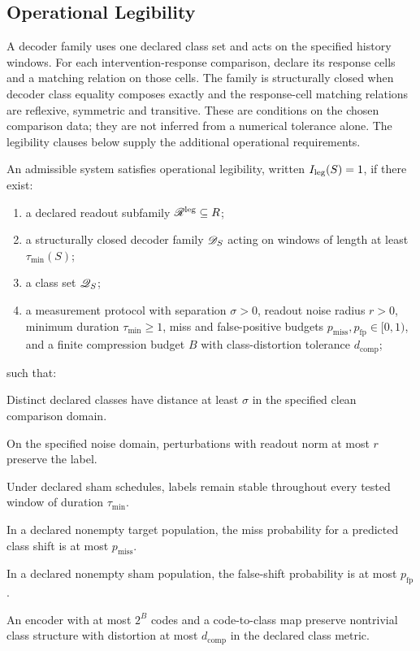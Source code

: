 \subsection{Operational Legibility}\label{sec:legibility}

\begin{definition}\label{def:decoder}
A decoder family uses one declared class set and acts on the specified history windows. For each intervention-response comparison, declare its response cells and a matching relation on those cells. The family is structurally closed when decoder class equality composes exactly and the response-cell matching relations are reflexive, symmetric and transitive. These are conditions on the chosen comparison data; they are not inferred from a numerical tolerance alone. The legibility clauses below supply the additional operational requirements.
\end{definition}

\begin{definition}\label{def:ileg}
An admissible system satisfies operational legibility, written $I_{\mathrm{leg}}(S)=1$, if there exist:
\begin{enumerate}[leftmargin=1.5em]
\item a declared readout subfamily $\mathscr{R}^{\mathrm{leg}}\subseteq R$;
\item a structurally closed decoder family $\mathscr{D}_S$ acting on windows of length at least $\tau_{\min}(S)$;
\item a class set $\mathscr{Q}_S$;
\item a measurement protocol with separation $\sigma>0$, readout noise radius $r>0$, minimum duration $\tau_{\min}\ge1$, miss and false-positive budgets $p_{\mathrm{miss}},p_{\mathrm{fp}}\in[0,1)$, and a finite compression budget $B$ with class-distortion tolerance $d_{\mathrm{comp}}$;
\end{enumerate}
such that:
\begin{description}[leftmargin=1.7em]
\item[(L1) Separability] Distinct declared classes have distance at least $\sigma$ in the specified clean comparison domain.
\item[(L2) Noise robustness] On the specified noise domain, perturbations with readout norm at most $r$ preserve the label.
\item[(L3) Persistence window] Under declared sham schedules, labels remain stable throughout every tested window of duration $\tau_{\min}$.
\item[(L4) Intervention fidelity] In a declared nonempty target population, the miss probability for a predicted class shift is at most $p_{\mathrm{miss}}$.
\item[(L5) Negative controls] In a declared nonempty sham population, the false-shift probability is at most $p_{\mathrm{fp}}$.
\item[(L6) Structured compressibility] An encoder with at most $2^B$ codes and a code-to-class map preserve nontrivial class structure with distortion at most $d_{\mathrm{comp}}$ in the declared class metric.
\end{description}
\end{definition}

